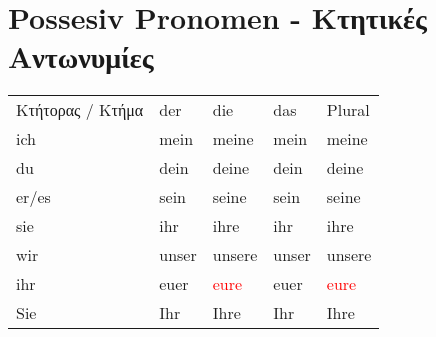 \section{Possesiv Pronomen - Κτητικές Αντωνυμίες}


\begin{tabular}{l|l|l|l|l}
 Κτήτορας / Κτήμα & der & die & das & Plural \\
 ich & mein & meine & mein & meine \\
 du & dein & deine & dein & deine \\
 er/es & sein & seine & sein & seine \\
 sie & ihr & ihre & ihr & ihre \\
 wir & unser & unsere & unser & unsere \\
 ihr & euer & \textcolor{red}{eure} & euer & \textcolor{red}{eure} \\
 Sie & Ihr & Ihre & Ihr & Ihre
\end{tabular}
